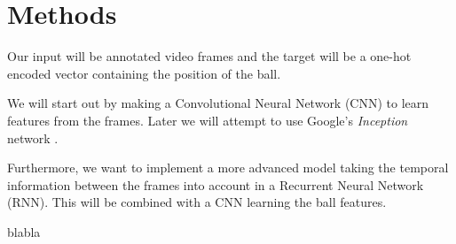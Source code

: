
\section{Methods}
Our input will be annotated video frames and the target will be a one-hot encoded vector containing the position of the ball.

We will start out by making a Convolutional Neural Network (CNN) to learn features from the frames.
Later we will attempt to use Google's \textit{Inception} network \cite{inception}.

Furthermore, we want to implement a more advanced model taking the temporal information between the frames into account in a Recurrent Neural Network (RNN). This will be combined with a CNN learning the ball features.

blabla